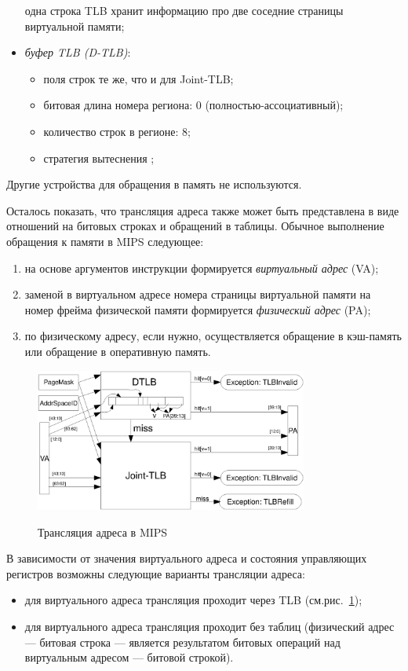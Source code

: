 \begin{itemize}
        одна строка TLB хранит информацию про две соседние страницы виртуальной
        памяти;
  \item \emph{буфер TLB (D-TLB)}:
        \begin{itemize}
            \item поля строк те же, что и для Joint-TLB;
            \item битовая длина номера региона: 0 (полностью-ассоциативный);
            \item количество строк в регионе: 8;
            \item стратегия вытеснения \LRU;
        \end{itemize}
\end{itemize}

Другие устройства для обращения в память не используются.

Осталось показать, что трансляция адреса также может быть представлена в виде
отношений на битовых строках и обращений в таблицы. Обычное выполнение
обращения к памяти в MIPS следующее:
\begin{enumerate}
    \item на основе аргументов инструкции формируется \emph{виртуальный адрес} (VA);
    \item заменой в виртуальном адресе номера страницы виртуальной памяти на номер фрейма физической памяти формируется \emph{физический адрес} (PA);
    \item по физическому адресу, если нужно, осуществляется обращение в кэш-память или обращение в оперативную память.
\end{enumerate}

\begin{figure}[h] \center
  \includegraphics[width=0.8\textwidth]{4.analysis/mips_addrtrans}\\
  \caption{Трансляция адреса в MIPS}\label{fig:mips_address_translation}
\end{figure}


В зависимости от значения виртуального адреса и состояния управляющих регистров
возможны следующие варианты трансляции адреса:
\begin{itemize}
  \item для виртуального адреса трансляция проходит через TLB
(см.рис.~\ref{fig:mips_address_translation});
  \item для виртуального адреса трансляция проходит без таблиц (физический адрес
--- битовая строка --- является результатом битовых операций над виртуальным
адресом --- битовой строкой).
\end{itemize}

